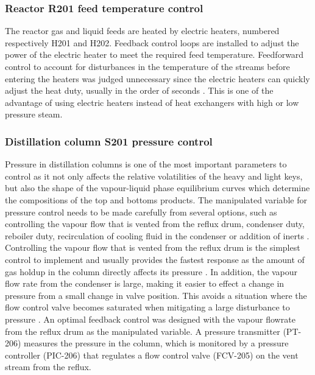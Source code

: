 \subsubsection{Reactor R201 feed temperature control}%
The reactor gas and liquid feeds are heated by electric heaters, numbered respectively H201 and H202. Feedback control loops are installed to adjust the power of the electric heater to meet the required feed temperature. Feedforward control to account for disturbances in the temperature of the streams before entering the heaters was judged unnecessary since the electric heaters can quickly adjust the heat duty, usually in the order of seconds \cite{wattco_flanged_nodate}. This is one of the advantage of using electric heaters instead of heat exchangers with high or low  pressure steam.


\subsubsection{Distillation column S201 pressure control} %
Pressure in distillation columns is one of the most important parameters to control as it not only affects the relative volatilities of the heavy and light keys, but also the shape of the vapour-liquid phase equilibrium curves which determine the compositions of the top and bottoms products\cite{kister_distillation_1990}. The manipulated variable for pressure control needs to be made carefully from several options, such as controlling the vapour flow that is vented from the reflux drum, condenser duty, reboiler duty, recirculation of cooling fluid in the condenser or addition of inerts \cite{kister_distillation_1990}. Controlling the vapour flow that is vented from the reflux drum is the simplest control to implement and usually provides the fastest response as the amount of gas holdup in the column directly affects its pressure \cite{riggs_distillation_2015,kister_distillation_1990}. In addition, the vapour flow rate from the condenser is large, making it easier to effect a change in pressure from a small change in valve position. This avoids a situation where the flow control valve becomes saturated when mitigating a large disturbance to pressure \cite{luyben_practical_1992}. 
An optimal feedback control was designed with the vapour flowrate from the reflux drum as the manipulated variable. A pressure transmitter (PT-206) measures the pressure in the column, which is monitored by a pressure controller (PIC-206) that regulates a flow control valve (FCV-205) on the vent stream from the reflux.

